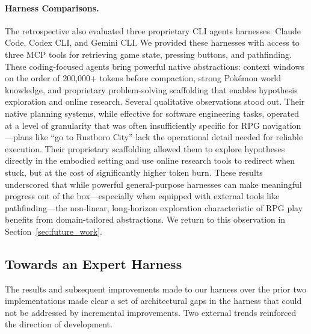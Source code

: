 \paragraph{Harness Comparisons.} The retrospective also evaluated three proprietary CLI agents harnesses: Claude Code, Codex CLI, and Gemini CLI. We provided these harnesses with access to three MCP tools for retrieving game state, pressing buttons, and pathfinding. These coding-focused agents bring powerful native abstractions: context windows on the order of 200,000+ tokens before compaction, strong Pok\'{e}mon world knowledge, and proprietary problem-solving scaffolding that enables hypothesis exploration and online research. Several qualitative observations stood out. Their native planning systems, while effective for software engineering tasks, operated at a level of granularity that was often insufficiently specific for RPG navigation---plans like ``go to Rustboro City'' lack the operational detail needed for reliable execution. Their proprietary scaffolding allowed them to explore hypotheses directly in the embodied setting and use online research tools to redirect when stuck, but at the cost of significantly higher token burn. These results underscored that while powerful general-purpose harnesses can make meaningful progress out of the box---especially when equipped with external tools like pathfinding---the non-linear, long-horizon exploration characteristic of RPG play benefits from domain-tailored abstractions. We return to this observation in Section~\ref{sec:future_work}.

\subsection{Towards an Expert Harness}\label{sec:towards_subagents}

The results and subsequent improvements made to our harness over the prior two implementations made clear a set of architectural gaps in the harness that could not be addressed by incremental improvements. Two external trends reinforced the direction of development.

